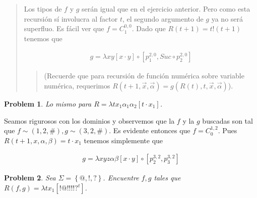 \documentclass[a4paper, 12pt]{article}
\newtheorem{problem}{Problem}
\newtheorem{problem}{Problem}
\begin{document}
\small
\begin{quote}

Los tipos de $f$ y $g$ serán igual que en el ejercicio anterior. Pero como esta
recursión sí involucra al factor $t$, el segundo argumento de $g$ ya no será
superfluo. Es fácil ver que $f = C_{1}^{0, 0}$. Dado que $R(t+1) = t!(t+1)$
tenemos que 

\begin{align*}
    g = \lambda xy \left[ x\cdot y  \right] \circ \left[ p_1^{2, 0}, Suc \circ
    p_2^{2, 0} \right] 
\end{align*}

\begin{quote}
    (Recuerde que para recursión de función numérica sobre variable numérica,
    requerimos $R(t+1, \vec{x}, \vec{\alpha}) = g(R(t), t, \vec{x},
    \vec{\alpha})$).
\end{quote}


\end{quote}
\normalsize

\begin{problem}
    Lo mismo para $R = \lambda t x_1 \alpha_1 \alpha_2 \left[ t \cdot x_1  \right]$.
\end{problem}

Seamos rigurosos con los dominios y observemos que la $f$ y la $g$ buscadas son
tal que $f \sim (1, 2, \#), g \sim  (3, 2, \#)$. Es evidente entonces que  $f =
C_0^{1, 2}$. Pues $R(t + 1, x, \alpha, \beta) = t \cdot x_1$ tenemos simplemente
que 

\begin{align*}
    g = \lambda xyz\alpha\beta \left[ x \cdot y  \right] \circ \left[ p_2^{3,
    2}, p_3^{3, 2} \right] 
\end{align*}

\begin{problem}
    Sea $\Sigma = \left\{ @, !, ? \right\} $. Encuentre $f, g$ tales que $R(f,
    g) = \lambda t x_1 \left[ !@!!!!?^t  \right]$.
\end{problem}
\end{document}
